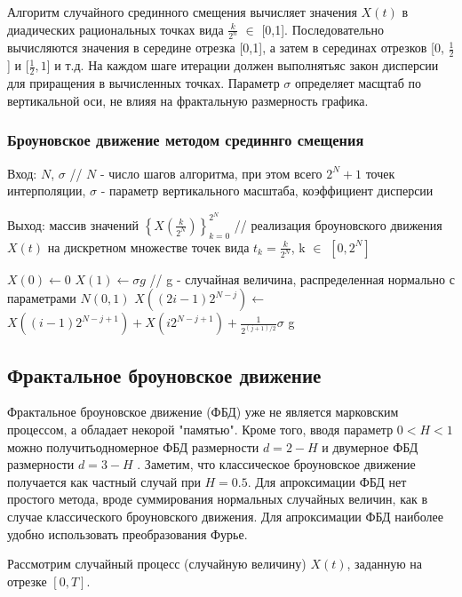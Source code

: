 Алгоритм случайного срединного смещения вычисляет значения $X(t)$ в диадических рациональных точках вида $\frac{k}{2^n}$ $\in$ [0,1]. Последовательно вычисляются значения в середине отрезка [0,1], а затем в серединах отрезков [0, $\frac{1}{2}$] и [$\frac{1}{2}, 1$] и т.д. На каждом шаге итерации должен выполнятьяс закон дисперсии для приращения в вычисленных точках. Параметр $\sigma$ определяет масщтаб по вертикальной оси, не влияя на фрактальную размерность графика. 

\subsubsection{Броуновское движение методом срединнго смещения}

Вход: $N$, 	$\sigma$ // $N$ - число шагов алгоритма, при этом всего $2^N + 1$ точек интерполяции, $\sigma$ - параметр вертикального масштаба, коэффициент дисперсии

Выход: массив значений $\left\{X(\frac{k}{2^N})\right\}_{k=0}^{2^N}$ // реализация броуновского движения $X(t)$ на дискретном множестве точек вида $t_k = \frac{k}{2^N}$, k $\in$ $[0, 2^N]$

\begin{algorithmic}[1]
	\State $X(0)\gets 0$
	\State $X(1)\gets \sigma g$ // g - случайная величина, распределенная нормально с параметрами $N(0,1)$
	\State $X((2i - 1) 2^{N - j})$$\gets$ $X((i - 1)2^{N-j+1}) + X(i2^{N - j + 1}) + \frac{1}{2^{(j+1)/2}}$$\sigma$ g
	\EndFor
	\EndFor
\end{algorithmic}

\subsection{Фрактальное броуновское движение}

Фрактальное броуновское движение (ФБД) уже не является марковским процессом, а обладает некорой "памятью". Кроме того, вводя параметр $0 < H < 1$ можно получитьодномерное ФБД размерности $d = 2 - H$ и двумерное ФБД размерности $d = 3 - H$ .
Заметим, что классическое броуновское движение получается как частный случай при $H = 0.5$. Для апроксимации ФБД нет простого метода, вроде суммирования нормальных случайных величин, как в случае классического броуновского движения. Для апроксимации ФБД наиболее удобно использовать преобразования Фурье.

Рассмотрим случайный процесс (случайную величину) $X(t)$, заданную на отрезке $[0, T]$.

